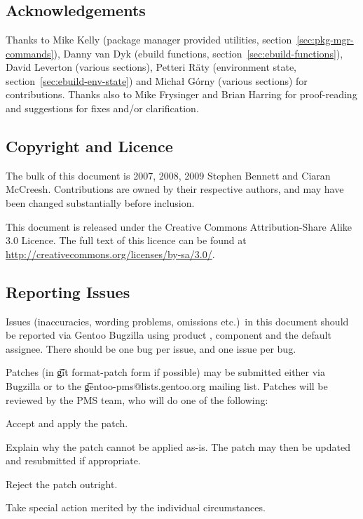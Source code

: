 \chapter*{}

\section*{Acknowledgements}

Thanks to Mike Kelly (package manager provided utilities, section~\ref{sec:pkg-mgr-commands}),
Danny van Dyk (ebuild functions, section~\ref{sec:ebuild-functions}), David Leverton (various
sections), Petteri Räty (environment state, section~\ref{sec:ebuild-env-state}) and Michał Górny
(various sections) for contributions. Thanks also to Mike Frysinger and Brian Harring for
proof-reading and suggestions for fixes and/or clarification.

\section*{Copyright and Licence}

The bulk of this document is \textcopyright{} 2007, 2008, 2009 Stephen Bennett and Ciaran McCreesh.
Contributions are owned by their respective authors, and may have been changed substantially before
inclusion.

This document is released under the Creative Commons Attribution-Share Alike 3.0 Licence. The full
text of this licence can be found at \url{http://creativecommons.org/licenses/by-sa/3.0/}.

\section*{Reporting Issues}

Issues (inaccuracies, wording problems, omissions etc.)\ in this document should be reported via
Gentoo Bugzilla using product , component  and the default
assignee. There should be one bug per issue, and one issue per bug.

Patches (in \t{git format-patch} form if possible) may be submitted either via Bugzilla or to the
\t{gentoo-pms@lists.gentoo.org} mailing list. Patches will be reviewed by the PMS team, who will do
one of the following:

\begin{compactitem}
\item Accept and apply the patch.
\item Explain why the patch cannot be applied as-is. The patch may then be updated and resubmitted
if \mbox{appropriate}.
\item Reject the patch outright.
\item Take special action merited by the individual circumstances.
\end{compactitem}

